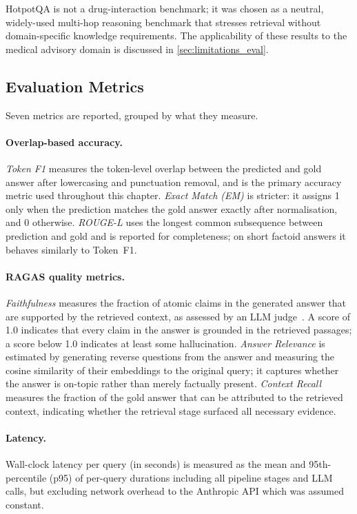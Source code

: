 HotpotQA is not a drug-interaction benchmark; it was chosen as a neutral,
widely-used multi-hop reasoning benchmark that stresses retrieval without
domain-specific knowledge requirements.
The applicability of these results to the medical advisory domain is discussed
in \cref{sec:limitations_eval}.

\subsection{Evaluation Metrics}

Seven metrics are reported, grouped by what they measure.

\paragraph{Overlap-based accuracy.}
\emph{Token F1} measures the token-level overlap between the predicted and gold
answer after lowercasing and punctuation removal, and is the primary accuracy
metric used throughout this chapter.
\emph{Exact Match (EM)} is stricter: it assigns 1 only when the prediction matches
the gold answer exactly after normalisation, and 0 otherwise.
\emph{ROUGE-L} uses the longest common subsequence between prediction and gold
and is reported for completeness; on short factoid answers it behaves similarly
to Token~F1.

\paragraph{RAGAS quality metrics.}
\emph{Faithfulness} measures the fraction of atomic claims in the generated
answer that are supported by the retrieved context, as assessed by an LLM
judge~\cite{es2023ragas}.
A score of 1.0 indicates that every claim in the answer is grounded in the
retrieved passages; a score below 1.0 indicates at least some hallucination.
\emph{Answer Relevance} is estimated by generating reverse questions from the
answer and measuring the cosine similarity of their embeddings to the original
query; it captures whether the answer is on-topic rather than merely factually
present.
\emph{Context Recall} measures the fraction of the gold answer that can be
attributed to the retrieved context, indicating whether the retrieval stage
surfaced all necessary evidence.

\paragraph{Latency.}
Wall-clock latency per query (in seconds) is measured as the mean and 95th-percentile
(p95) of per-query durations including all pipeline stages and LLM calls, but
excluding network overhead to the Anthropic API which was assumed constant.

